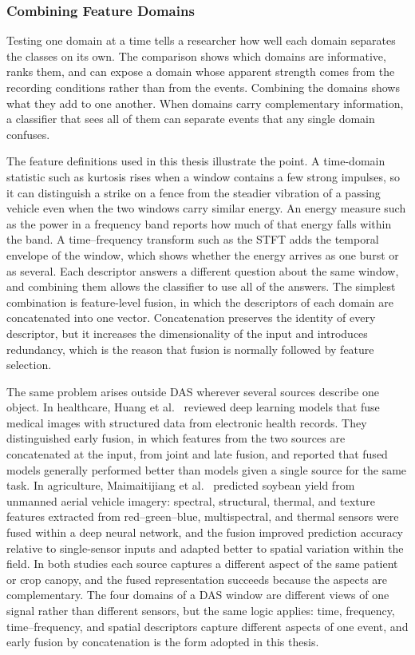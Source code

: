 \subsubsection{Combining Feature Domains}
\label{sec:chap2FeatureFusion}
Testing one domain at a time tells a researcher how well each domain separates the classes on its own. The comparison shows which domains are informative, ranks them, and can expose a domain whose apparent strength comes from the recording conditions rather than from the events. Combining the domains shows what they add to one another. When domains carry complementary information, a classifier that sees all of them can separate events that any single domain confuses.

The feature definitions used in this thesis illustrate the point. A time-domain statistic such as kurtosis rises when a window contains a few strong impulses, so it can distinguish a strike on a fence from the steadier vibration of a passing vehicle even when the two windows carry similar energy. An energy measure such as the power in a frequency band reports how much of that energy falls within the band. A time--frequency transform such as the STFT adds the temporal envelope of the window, which shows whether the energy arrives as one burst or as several. Each descriptor answers a different question about the same window, and combining them allows the classifier to use all of the answers. The simplest combination is feature-level fusion, in which the descriptors of each domain are concatenated into one vector. Concatenation preserves the identity of every descriptor, but it increases the dimensionality of the input and introduces redundancy, which is the reason that fusion is normally followed by feature selection.

The same problem arises outside DAS wherever several sources describe one object. In healthcare, Huang et al.~\cite{huang2020fusion} reviewed deep learning models that fuse medical images with structured data from electronic health records. They distinguished early fusion, in which features from the two sources are concatenated at the input, from joint and late fusion, and reported that fused models generally performed better than models given a single source for the same task. In agriculture, Maimaitijiang et al.~\cite{maimaitijiang2020soybean} predicted soybean yield from unmanned aerial vehicle imagery: spectral, structural, thermal, and texture features extracted from red--green--blue, multispectral, and thermal sensors were fused within a deep neural network, and the fusion improved prediction accuracy relative to single-sensor inputs and adapted better to spatial variation within the field. In both studies each source captures a different aspect of the same patient or crop canopy, and the fused representation succeeds because the aspects are complementary. The four domains of a DAS window are different views of one signal rather than different sensors, but the same logic applies: time, frequency, time--frequency, and spatial descriptors capture different aspects of one event, and early fusion by concatenation is the form adopted in this thesis.

